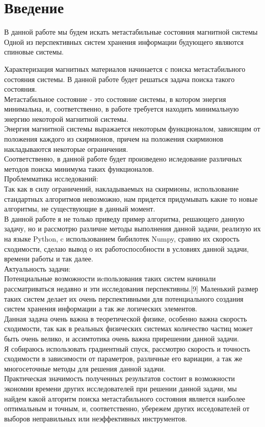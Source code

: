 \documentclass[ 12pt,x11names]{article}
\begin{document}
    \tableofcontents %
    \clearpage
    \section{Введение}    \noindent
    В данной работе мы будем искать метастабильные состояния магнитной системы\\
    Одной из перспективных систем хранения информации будующего являются спиновые системы.

    Характеризация магнитных материалов начинается с  поиска метастабильного состояния системы.
    В данной работе будет решаться задача поиска такого состояния.\\
        Метастабильное состояние - это состояние системы, в котором энергия минимальна, и, соответственно, в работе требуется находить минимальную энергию некоторой магнитной системы.\\
    Энергия магнитной системы выражается некоторым функционалом, зависящим от положения каждого из скирмионов, причем на положения скирмионов накладываются некоторые ограничения. \\Соответственно, в данной работе будет произведено иследование различных методов поиска минимума таких функционалов.\\
    Проблемматика исследований:\\
     Так как в силу ограничений, накладываемых на скирмионы, использование стандартных алгоритмов невозможно, нам придется придумывать какие то новые алгоритмы, не существующие в данный момент.\\
    В данной работе я не только приведу пример алгоритма, решающего данную задачу, но и   рассмотрю различне методы выполнения данной задачи, реализую их на языке Python, c использованием бибилотек Numpy, сравню их скорость сходимости, сделаю вывод о их работоспособности в условиях данной задачи, времени работы и так далее.\\
    Актуальность задачи:\\
     Потенциальные возможности иcпользования таких систем начинали рассматриваться недавно и эти исследования перспективны.[9]
     Маленький размер таких систем делает их очень перспективными для потенциального создания систем хранения информации а так же логических элементов.\\
    Данная задача очень важна в теоретической физике, особенно важна скорость сходимости, так как в реальных физических системах количество частиц может быть очень велико, и ассимтотика очень важна прирешении данной задачи.\\
    Я собираюсь использовать градиентный спуск, рассмотрю скорость и точность сходимости в зависимости от параметров, различные его вариации, а так же многосеточные методы для решения данной задачи.\\
     Практическая значимость полученных результатов состоит в возможности экономии времени других исследователей при решении данной задачи, мы найдем какой алгоритм поиска метастабильного состояния является наиболее оптимальным и точным, и, соответственно, убережем других исседователей от выборов неправильных или неэффективных инструментов.\\
\end{document}
